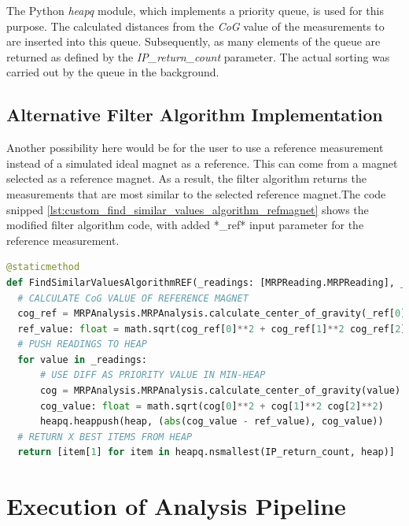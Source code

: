 The Python \emph{heapq} \cite{heapq} module, which implements a
priority queue, is used for this purpose. The calculated distances from
the \emph{CoG} value of the measurements to are inserted into this
queue. Subsequently, as many elements of the queue are returned as
defined by the \emph{IP\_return\_count} parameter. The actual sorting
was carried out by the queue in the background.

\hypertarget{alternative-filter-algorithm-implementation}{%
\subsection{Alternative Filter Algorithm
Implementation}\label{alternative-filter-algorithm-implementation}}

Another possibility here would be for the user to use a reference
measurement instead of a simulated ideal magnet as a reference. This can
come from a magnet selected as a reference magnet. As a result, the
filter algorithm returns the measurements that are most similar to the
selected reference magnet.The code snipped
\ref{lst:custom_find_similar_values_algorithm_refmagnet} shows the
modified filter algorithm code, with added *\_ref* input parameter for
the reference measurement.

\begin{lstlisting}[language=Python, caption={Modified user implemented custom find algorithm using a reference magnet reading}, label=lst:custom_find_similar_values_algorithm_refmagnet]
@staticmethod
def FindSimilarValuesAlgorithmREF(_readings: [MRPReading.MRPReading], _ref: [MRPReading.MRPReading], IP_return_count: int = 4) -> [MRPReading.MRPReading]:
  # CALCULATE CoG VALUE OF REFERENCE MAGNET
  cog_ref = MRPAnalysis.MRPAnalysis.calculate_center_of_gravity(_ref[0])
  ref_value: float = math.sqrt(cog_ref[0]**2 + cog_ref[1]**2 cog_ref[2]**2)
  # PUSH READINGS TO HEAP
  for value in _readings:
      # USE DIFF AS PRIORITY VALUE IN MIN-HEAP
      cog = MRPAnalysis.MRPAnalysis.calculate_center_of_gravity(value)
      cog_value: float = math.sqrt(cog[0]**2 + cog[1]**2 cog[2]**2)
      heapq.heappush(heap, (abs(cog_value - ref_value), cog_value))
  # RETURN X BEST ITEMS FROM HEAP
  return [item[1] for item in heapq.nsmallest(IP_return_count, heap)]
\end{lstlisting}

\hypertarget{execution-of-analysis-pipeline}{%
\section{Execution of Analysis
Pipeline}\label{execution-of-analysis-pipeline}}

